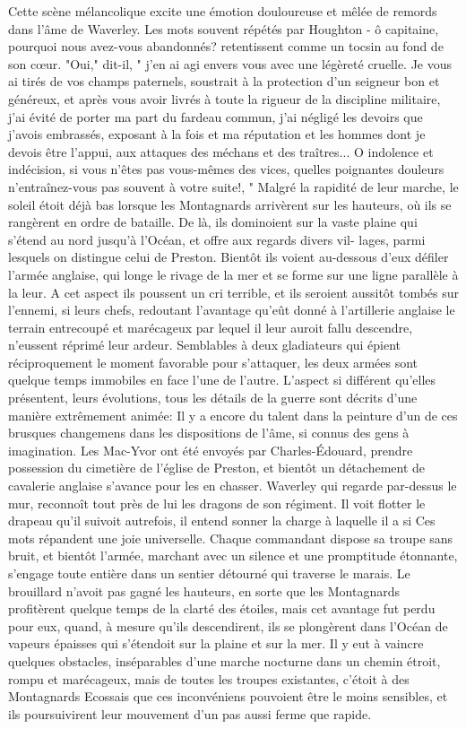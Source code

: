 Cette scène mélancolique excite une émotion douloureuse et mêlée de remords dans l'âme de Waverley. Les mots souvent répétés par Houghton - ô capitaine, pourquoi nous avez-vous abandonnés? retentissent comme un tocsin au fond de son cœur. "Oui," dit-il, " j'en ai agi envers vous avec une légèreté cruelle. Je vous ai tirés de vos champs paternels, soustrait à la protection d'un seigneur bon et généreux, et après vous avoir livrés à toute la rigueur de la discipline militaire, j'ai évité de porter ma part du fardeau commun, j'ai négligé les devoirs que j'avois embrassés, exposant à la fois et ma réputation et les hommes dont je devois être l'appui, aux attaques des méchans et des traîtres... O indolence et indécision, si vous n'êtes pas vous-mêmes des vices, quelles poignantes douleurs n'entraînez-vous pas souvent à votre suite!, "
Malgré la rapidité de leur marche, le soleil étoit déjà bas lorsque les Montagnards arrivèrent sur les hauteurs, où ils se rangèrent en ordre de bataille. De là, ils dominoient sur la vaste plaine qui s'étend au nord jusqu'à l'Océan, et offre aux regards divers vil-\setcounter{page}{239} lages, parmi lesquels on distingue celui de Preston. Bientôt ils voient au-dessous d'eux défiler l'armée anglaise, qui longe le rivage de la mer et se forme sur une ligne parallèle à la leur. A cet aspect ils poussent un cri terrible, et ils seroient aussitôt tombés sur l'ennemi, si leurs chefs, redoutant l'avantage qu'eût donné à l'artillerie anglaise le terrain entrecoupé et marécageux par lequel il leur auroit fallu descendre, n'eussent réprimé leur ardeur. Semblables à deux gladiateurs qui épient réciproquement le moment favorable pour s'attaquer, les deux armées sont quelque temps immobiles en face l'une de l'autre. L'aspect si différent qu'elles présentent, leurs évolutions, tous les détails de la guerre sont décrits d'une manière extrêmement animée: Il y a encore du talent dans la peinture d'un de ces brusques changemens dans les dispositions de l'âme, si connus des gens à imagination. Les Mac-Yvor ont été envoyés par Charles-Édouard, prendre possession du cimetière de l'église de Preston, et bientôt un détachement de cavalerie anglaise s'avance pour les en chasser. Waverley qui regarde par-dessus le mur, reconnoît tout près de lui les dragons de son régiment. Il voit flotter le drapeau qu'il suivoit autrefois, il entend sonner la charge à laquelle il a si\setcounter{page}{242} Ces mots répandent une joie universelle. Chaque commandant dispose sa troupe sans bruit, et bientôt l'armée, marchant avec un silence et une promptitude étonnante, s'engage toute entière dans un sentier détourné qui traverse le marais. Le brouillard n'avoit pas gagné les hauteurs, en sorte que les Montagnards profitèrent quelque temps de la clarté des étoiles, mais cet avantage fut perdu pour eux, quand, à mesure qu'ils descendirent, ils se plongèrent dans l'Océan de vapeurs épaisses qui s'étendoit sur la plaine et sur la mer. Il y eut à vaincre quelques obstacles, inséparables d'une marche nocturne dans un chemin étroit, rompu et marécageux, mais de toutes les troupes existantes, c'étoit à des Montagnards Ecossais que ces inconvéniens pouvoient être le moins sensibles, et ils poursuivirent leur mouvement d'un pas aussi ferme que rapide.
